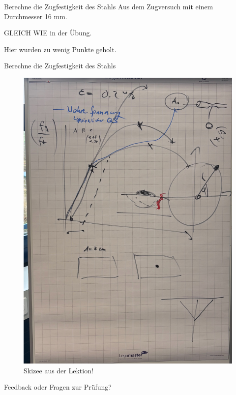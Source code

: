 \begin{frame}{Berechne die Zugfestigkeit des Stahls}
    Aus dem Zugversuch mit einem Durchmesser 16 mm. 

    \vspace{\baselineskip} 

    GLEICH WIE in der Übung.

    \vspace{\baselineskip} 

    Hier wurden zu wenig Punkte geholt.
    
\end{frame}

\begin{frame}{Berechne die Zugfestigkeit des Stahls}

\begin{figure}[h!]
    \centering
    \includegraphics[height=0.72\textheight]{Spannung_Dehnung_Lektion.jpeg}
    \caption{Skizee aus der Lektion!}
    \label{fig:zugfestigkeit}
\end{figure}

\end{frame}

\begin{frame}{Feedback oder Fragen zur Prüfung?}
    
\end{frame}





\folieFragen
